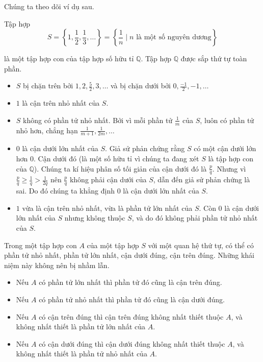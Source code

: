 Chúng ta theo dõi ví dụ sau.
\begin{example}
    Tập hợp
    \[
        S = \left\{ 1, \frac{1}{2}, \frac{1}{3}, \ldots \right\} = \left\{ \frac{1}{n} \mid \text{$n$ là một số nguyên dương} \right\}
    \]

    là một tập hợp con của tập hợp số hữu tỉ $\mathbb{Q}$. Tập hợp $\mathbb{Q}$ được sắp thứ tự toàn phần.
    \begin{itemize}
        \item $S$ bị chặn trên bởi $1, 2, \frac{5}{2}, 3, \ldots$ và bị chặn dưới bởi $0, \frac{-1}{2}, -1, \ldots$
        \item $1$ là cận trên nhỏ nhất của $S$.
        \item $S$ không có phần tử nhỏ nhất. Bởi vì mỗi phần tử $\frac{1}{m}$ của $S$, luôn có phần tử nhỏ hơn, chẳng hạn $\frac{1}{m+1}, \frac{1}{2m}, \ldots$
        \item $0$ là cận dưới lớn nhất của $S$. Giả sử phản chứng rằng $S$ có một cận dưới lớn hơn $0$. Cận dưới đó (là một số hữu tỉ vì chúng ta đang xét $S$ là tập hợp con của $\mathbb{Q}$). Chúng ta kí hiệu phân số tối giản của cận dưới đó là $\frac{p}{q}$. Nhưng vì $\frac{p}{q}\geq \frac{1}{q} > \frac{1}{2q}$ nên $\frac{p}{q}$ không phải cận dưới của $S$, dẫn đến giả sử phản chứng là sai. Do đó chúng ta khẳng định $0$ là cận dưới lớn nhất của $S$.
        \item $1$ vừa là cận trên nhỏ nhất, vừa là phần tử lớn nhất của $S$. Còn $0$ là cận dưới lớn nhất của $S$ nhưng không thuộc $S$, và do đó không phải phần tử nhỏ nhất của $S$.
    \end{itemize}
\end{example}

Trong một tập hợp con $A$ của một tập hợp $S$ với một quan hệ thứ tự, có thể có phần tử nhỏ nhất, phần tử lớn nhất, cận dưới đúng, cận trên đúng. Những khái niệm này không nên bị nhầm lẫn.
\begin{itemize}
    \item Nếu $A$ có phần tử lớn nhất thì phần tử đó cũng là cận trên đúng.
    \item Nếu $A$ có phần tử nhỏ nhất thì phần tử đó cũng là cận dưới đúng.
    \item Nếu $A$ có cận trên đúng thì cận trên đúng không nhất thiết thuộc $A$, và không nhất thiết là phần tử lớn nhất của $A$.
    \item Nếu $A$ có cận dưới đúng thì cận dưới đúng không nhất thiết thuộc $A$, và không nhất thiết là phần tử nhỏ nhất của $A$.
\end{itemize}

